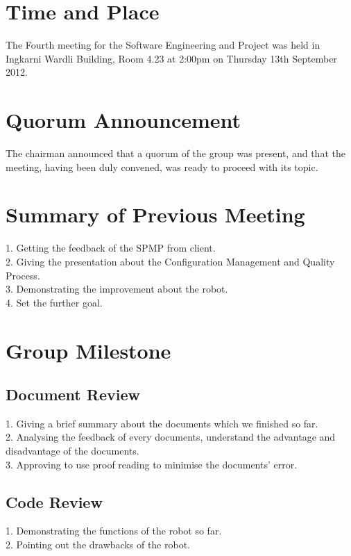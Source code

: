 \documentclass[11pt, a4paper]{article}
\begin{document}
\section{Time and Place}
The Fourth meeting for the Software Engineering and Project was held in Ingkarni Wardli Building, Room 4.23 at 2:00pm on Thursday 13th September 2012.

\section{Quorum Announcement}
The chairman announced that a quorum of the group was present, and that the meeting, having been duly convened, was ready to proceed with its topic.

\section{Summary of Previous Meeting}
1. Getting the feedback of the SPMP from client.\\
2. Giving the presentation about the Configuration Management and Quality Process.\\
3. Demonstrating the improvement about the robot.\\
4. Set the further goal.\\
 

\section{Group Milestone}

\subsection{Document Review}
1. Giving a brief summary about the documents which we finished so far.\\
2. Analysing the feedback of every documents, understand the advantage and disadvantage of the documents.\\
3. Approving to use proof reading to minimise the documents' error.\\ 

\subsection{Code Review}
1. Demonstrating the functions of the robot so far.\\
2. Pointing out the drawbacks of the robot.\\
\end{document}

